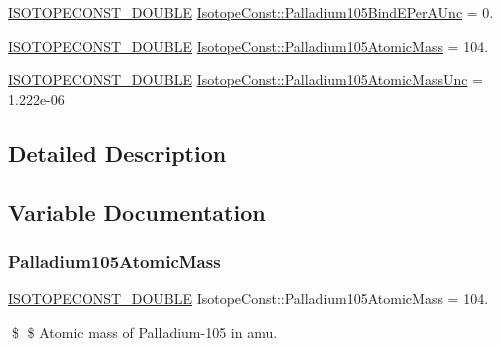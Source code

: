 \begin{DoxyCompactItemize}
\mbox{\hyperlink{group___isotope_const-_macros_ga8f45a7272ce02c0b4c65c44636ed719a}{I\+S\+O\+T\+O\+P\+E\+C\+O\+N\+S\+T\+\_\+\+D\+O\+U\+B\+LE}} \mbox{\hyperlink{group___isotope_const-_palladium-_pd105_gaeb8380a99b62c14846a91b2d8ff9f563}{Isotope\+Const\+::\+Palladium105\+Bind\+E\+Per\+A\+Unc}} = 0.
\item 
\mbox{\hyperlink{group___isotope_const-_macros_ga8f45a7272ce02c0b4c65c44636ed719a}{I\+S\+O\+T\+O\+P\+E\+C\+O\+N\+S\+T\+\_\+\+D\+O\+U\+B\+LE}} \mbox{\hyperlink{group___isotope_const-_palladium-_pd105_gaccc6d51c65170e2230536f63b4dae829}{Isotope\+Const\+::\+Palladium105\+Atomic\+Mass}} = 104.
\item 
\mbox{\hyperlink{group___isotope_const-_macros_ga8f45a7272ce02c0b4c65c44636ed719a}{I\+S\+O\+T\+O\+P\+E\+C\+O\+N\+S\+T\+\_\+\+D\+O\+U\+B\+LE}} \mbox{\hyperlink{group___isotope_const-_palladium-_pd105_gae09f4c44c8b122e6fe0dbe7cff2dbfa1}{Isotope\+Const\+::\+Palladium105\+Atomic\+Mass\+Unc}} = 1.\+222e-\/06
\end{DoxyCompactItemize}


\subsection{Detailed Description}


\subsection{Variable Documentation}
\mbox{\label{group___isotope_const-_palladium-_pd105_gaccc6d51c65170e2230536f63b4dae829}} 
\subsubsection{\texorpdfstring{Palladium105\+Atomic\+Mass}{Palladium105AtomicMass}}
{\footnotesize\ttfamily \mbox{\hyperlink{group___isotope_const-_macros_ga8f45a7272ce02c0b4c65c44636ed719a}{I\+S\+O\+T\+O\+P\+E\+C\+O\+N\+S\+T\+\_\+\+D\+O\+U\+B\+LE}} Isotope\+Const\+::\+Palladium105\+Atomic\+Mass = 104.}

\$ \$ Atomic mass of Palladium-\/105 in amu. \mbox{\label{group___isotope_const-_palladium-_pd105_gae09f4c44c8b122e6fe0dbe7cff2dbfa1}} 

